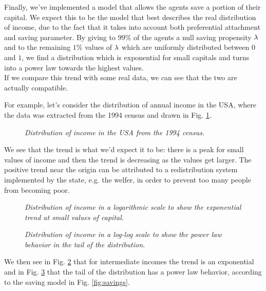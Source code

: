Finally, we've implemented a model that allows the agents save a portion of their capital.
We expect this to be the model that best describes the real distribution of income, due to the fact that it takes into account both preferential attachment and saving parameter.
By giving to $99 \%$ of the agents a null saving propensity $\lambda$ and to the remaining $1 \%$ values of $\lambda$ which are uniformly distributed between $0$ and $1$, we find a distribution which is exponential for small capitals and turns into a power law towards the highest values. \\
If we compare this trend with some real data, we can see that the two are actually compatible.

For example, let's consider the distribution of annual income in the USA, where the data was extracted from the 1994 census and drawn in Fig. \ref{fig:gloabl_realData}.
\begin{figure}[ht!]
    \centering
    \scalebox{.7}{}
    \caption{\emph{Distribution of income in the USA from the 1994 census.}}
    \label{fig:gloabl_realData}
\end{figure}
We see that the trend is what we'd expect it to be: there is a peak for small values of income and then the trend is decreasing as the values get larger.
The positive trend near the origin can be attributed to a redistribution system implemented by the state, e.g. the welfer, in order to prevent too many people from becoming poor. \\
\begin{figure}[ht!]
    \centering
    \scalebox{.7}{}
    \caption{\emph{Distribution of income in a logarithmic scale to show the exponential trend at small values of capital.}}
    \label{fig:real_head}
\end{figure}
\begin{figure}[ht!]
    \centering
    \scalebox{.7}{}
    \caption{\emph{Distribution of income in a log-log scale to show the power law behavior in the tail of the distribution.}}
    \label{fig:real_tail}
\end{figure}
We then see in Fig. \ref{fig:real_head} that for intermediate incomes the trend is an exponential and in Fig. \ref{fig:real_tail} that the tail of the distribution has a power law behavior, according to the saving model in Fig. \ref{fig:savings}.
